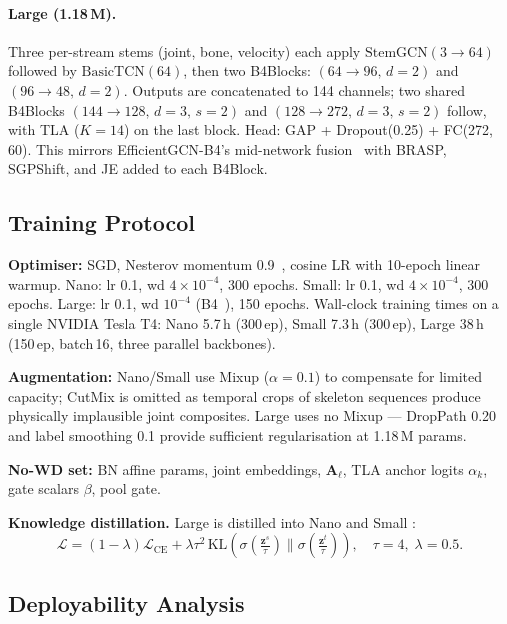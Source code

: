 \documentclass[sigconf,screen,review,anonymous]{acmart}
\begin{document}
\paragraph{Large (1.18\,M).}
Three per-stream stems (joint, bone, velocity) each apply
$\mathrm{StemGCN}(3{\to}64)$ followed by $\mathrm{BasicTCN}(64)$,
then two B4Blocks: $(64{\to}96,\,d{=}2)$ and $(96{\to}48,\,d{=}2)$.
Outputs are concatenated to 144 channels; two shared B4Blocks
$(144{\to}128,\,d{=}3,\,s{=}2)$ and $(128{\to}272,\,d{=}3,\,s{=}2)$
follow, with TLA ($K{=}14$) on the last block.
Head: GAP + Dropout(0.25) + FC(272,\,60).
This mirrors EfficientGCN-B4's mid-network fusion~\cite{efficientgcn}
with BRASP, SGPShift, and JE added to each B4Block.

\subsection{Training Protocol}\label{sec:training}

\textbf{Optimiser:} SGD, Nesterov momentum 0.9~, cosine LR with
10-epoch linear warmup.
Nano: lr 0.1, wd $4{\times}10^{-4}$, 300 epochs.
Small: lr 0.1, wd $4{\times}10^{-4}$, 300 epochs.
Large: lr 0.1, wd $10^{-4}$ (B4~\cite{efficientgcn}), 150 epochs.
Wall-clock training times on a single NVIDIA Tesla T4: Nano 5.7\,h
(300\,ep), Small 7.3\,h (300\,ep), Large 38\,h (150\,ep,
batch\,16, three parallel backbones).

\textbf{Augmentation:}
Nano/Small use Mixup ($\alpha{=}0.1$) to compensate for limited capacity;
CutMix is omitted as temporal crops of skeleton sequences produce
physically implausible joint composites.
Large uses no Mixup — DropPath 0.20 and label smoothing 0.1 provide
sufficient regularisation at 1.18\,M params.

\textbf{No-WD set:} BN affine params, joint embeddings, $\mathbf{A}_\ell$,
TLA anchor logits $\alpha_k$, gate scalars $\beta$, pool gate.

\textbf{Knowledge distillation.}
Large is distilled into Nano and Small \cite{kd}:
\begin{equation}
  \mathcal{L}
  = (1{-}\lambda)\mathcal{L}_\text{CE}
  + \lambda\tau^2\,
    \mathrm{KL}\!\left(
      \sigma\!\left(\tfrac{\mathbf{z}^s}{\tau}\right)
      \Big\|
      \sigma\!\left(\tfrac{\mathbf{z}^t}{\tau}\right)
    \right), \quad \tau{=}4,\;\lambda{=}0.5.
  \label{eq:kd}
\end{equation}

\subsection{Deployability Analysis}\label{sec:deploy}
\end{document}
